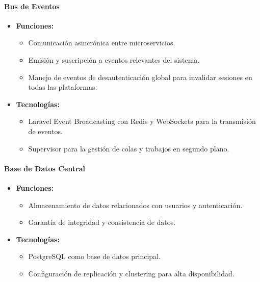 \documentclass{article}
\begin{document}
\paragraph{Bus de Eventos}
\begin{itemize}
    \item \textbf{Funciones:}
          \begin{itemize}
              \item Comunicación asincrónica entre microservicios.
              \item Emisión y suscripción a eventos relevantes del sistema.
              \item Manejo de eventos de desautenticación global para invalidar sesiones en todas las plataformas.
          \end{itemize}
    \item \textbf{Tecnologías:}
          \begin{itemize}
              \item Laravel Event Broadcasting con Redis y WebSockets para la transmisión de eventos.
              \item Supervisor para la gestión de colas y trabajos en segundo plano.
          \end{itemize}
\end{itemize}

\paragraph{Base de Datos Central}
\begin{itemize}
    \item \textbf{Funciones:}
          \begin{itemize}
              \item Almacenamiento de datos relacionados con usuarios y autenticación.
              \item Garantía de integridad y consistencia de datos.
          \end{itemize}
    \item \textbf{Tecnologías:}
          \begin{itemize}
              \item PostgreSQL como base de datos principal.
              \item Configuración de replicación y clustering para alta disponibilidad.
          \end{itemize}
\end{itemize}
\end{document}
